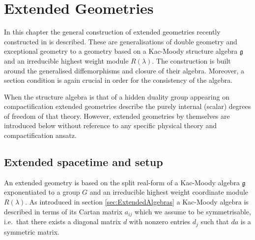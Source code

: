 \chapter{Extended Geometries}\label{chap:ExtendedGeometries}
In this chapter the general construction of extended geometries recently constructed in \cite{CederwallPalmkvist2017} is described. These are generalisations of double geometry and exceptional geometry to a geometry based on a Kac-Moody structure algebra $\mathfrak{g}$ and an irreducible highest weight module $R(\lambda)$. The construction is built around the generalised diffemorphisms and closure of their algebra. Moreover, a section condition is again crucial in order for the consistency of the algebra. 

When the structure algebra is that of a hidden duality group appearing on compactification extended geometries describe the purely internal (scalar) degrees of freedom of that theory. However, extended geometries by themselves are introduced below without reference to any specific physical theory and compactification ansatz. 

\section{Extended spacetime and setup}
An extended geometry is based on the split real-form of a Kac-Moody algebra $\mathfrak{g}$ exponentiated to a group $G$ and an irreducible highest weight coordinate module $R(\lambda)$. As introduced in section \ref{sec:ExtendedAlgebras} a Kac-Moody algebra is described in terms of its Cartan matrix $a_{ij}$ which we assume to be symmetrisable, i.e.\ that there exists a diagonal matrix $d$ with nonzero entries $d_j$ such that $da$ is a symmetric matrix. 

